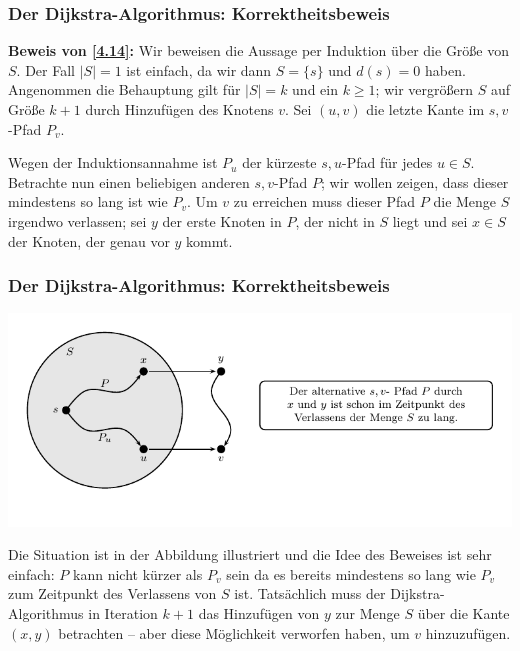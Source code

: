 \documentclass[smaller]{beamer}
\begin{document}
\begin{frame}
\frametitle{Der Dijkstra-Algorithmus: Korrektheitsbeweis}
\textbf{Beweis von \eqref{4.14}:} Wir beweisen die Aussage per Induktion über die Größe von $S$. Der Fall $|S| = 1$ ist einfach, da wir dann $S = \big\{ s \big\}$ und $d(s) = 0$ haben. Angenommen die Behauptung gilt für $|S| = k$ und ein $k \geq 1$; wir vergrößern $S$ auf Größe $k + 1$ durch Hinzufügen des Knotens $v$. Sei $(u, v)$ die letzte Kante im $s,v$-Pfad $P_v$. \\ \vspace*{0.2cm}

Wegen der Induktionsannahme ist $P_u$ der kürzeste $s,u$-Pfad für jedes $u \in S$. Betrachte nun einen beliebigen anderen $s,v$-Pfad $P$; wir wollen zeigen, dass dieser mindestens so lang ist wie $P_v$. Um $v$ zu erreichen muss dieser Pfad $P$ die Menge $S$ \alert{irgendwo} verlassen; sei $y$ der erste Knoten in $P$, der nicht in $S$ liegt und sei $x \in S$ der Knoten, der genau vor $y$ kommt.
\end{frame}

\begin{frame}
\frametitle{Der Dijkstra-Algorithmus: Korrektheitsbeweis}
\begin{center}
 \includegraphics[scale = 0.8]{fig79.pdf}
\end{center}

Die Situation ist in der Abbildung illustriert und die \alert{Idee des Beweises} ist sehr einfach: $P$ kann nicht kürzer als $P_v$ sein da es bereits mindestens so lang wie $P_v$ zum Zeitpunkt des Verlassens von $S$ ist. Tatsächlich muss der Dijkstra-Algorithmus in Iteration $k + 1$ das Hinzufügen von $y$ zur Menge $S$ über die Kante $(x, y)$ betrachten -- aber diese Möglichkeit verworfen haben, um $v$ hinzuzufügen. 
\end{frame}
\end{document}
